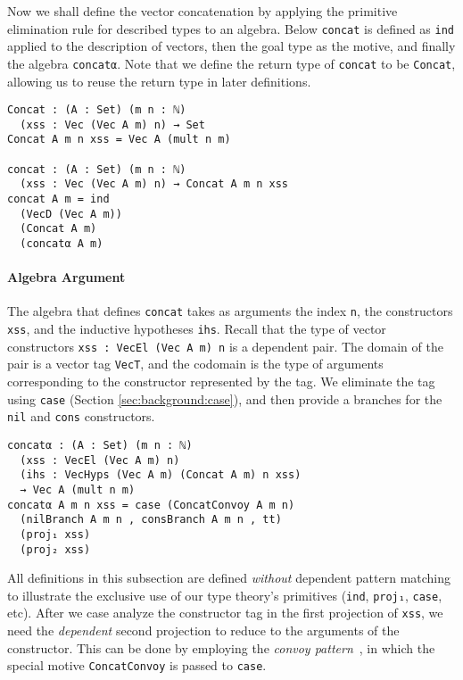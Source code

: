\documentclass[preprint,nonatbib]{sigplanconf}
\newcommand{\refsec}[1]{Section \ref{sec:#1}}
\begin{document}
Now we shall define the vector concatenation by applying the primitive
elimination rule for described types to an algebra. Below
{\tt concat} is defined as {\tt ind} applied to the description of
vectors, then the goal type as the motive, and finally the algebra
{\tt concatα}.
Note that we define the return type of
{\tt concat} to be {\tt Concat}, allowing us to reuse the return type
in later definitions.

\begin{verbatim}
Concat : (A : Set) (m n : ℕ)
  (xss : Vec (Vec A m) n) → Set
Concat A m n xss = Vec A (mult n m)

concat : (A : Set) (m n : ℕ)
  (xss : Vec (Vec A m) n) → Concat A m n xss
concat A m = ind
  (VecD (Vec A m))
  (Concat A m)
  (concatα A m)
\end{verbatim}

\paragraph{Algebra Argument}

The algebra that defines {\tt concat} takes as arguments the index
{\tt n}, the constructors {\tt xss}, and the inductive hypotheses
{\tt ihs}. Recall that the type of vector constructors
{\tt xss : VecEl (Vec A m) n} is a dependent pair. The domain of the
pair is a vector tag {\tt VecT}, and the codomain is the type of
arguments corresponding to the constructor represented by the tag. We
eliminate the tag using {\tt case} (\refsec{background:case}), and
then provide a branches for the {\tt nil} and {\tt cons} constructors.

\begin{verbatim}
concatα : (A : Set) (m n : ℕ)
  (xss : VecEl (Vec A m) n)
  (ihs : VecHyps (Vec A m) (Concat A m) n xss)
  → Vec A (mult n m)
concatα A m n xss = case (ConcatConvoy A m n)
  (nilBranch A m n , consBranch A m n , tt)
  (proj₁ xss)
  (proj₂ xss)
\end{verbatim}

All definitions in this subsection are defined {\it without} dependent
pattern matching to illustrate the exclusive use of our type theory's
primitives ({\tt ind}, {\tt proj₁}, {\tt case}, etc). After we case
analyze the constructor tag in the first projection of {\tt xss}, we
need the {\it dependent} second projection to reduce to the arguments
of the constructor. This can be done by employing the
{\it convoy pattern}~\citep{chlipala2011certified}, in which the special motive
{\tt ConcatConvoy} is passed to {\tt case}.
\end{document}
